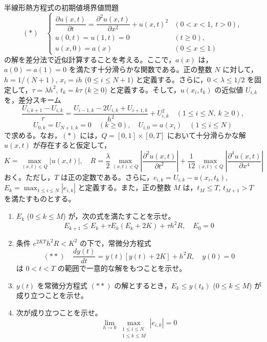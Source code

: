 \documentclass[12pt]{jlreq}
\begin{document}
半線形熱方程式の初期値境界値問題
\[
  (*) \quad \begin{cases} \dfrac{\partial u(x,t)}{\partial t} = \dfrac{\partial^2 u(x,t)}{\partial x^2} + u(x,t)^2 & (0 < x < 1,\ t > 0), \\ u(0,t) = u(1,t) = 0 & (t \ge 0), \\ u(x,0) = a(x) & (0 \le x \le 1) \end{cases}
\]
の解を差分法で近似計算することを考える。ここで，$a(x)$ は，$a(0) = a(1) = 0$ を満たす十分滑らかな関数である。正の整数 $N$ に対して，$h = 1/(N+1)$, $x_i = ih$ ($0 \le i \le N+1$) と定義する。さらに，$0 < \lambda \le 1/2$ を固定して，$\tau = \lambda h^2$, $t_k = k\tau$ ($k \ge 0$) と定義する。そして，$u(x_i, t_k)$ の近似値 $U_{i,k}$ を，差分スキーム
\[
  \frac{U_{i,k+1} - U_{i,k}}{\tau} = \frac{U_{i-1,k} - 2U_{i,k} + U_{i+1,k}}{h^2} + U_{i,k}^2 \quad (1 \le i \le N,\ k \ge 0),
\]
\[
  U_{0,k} = U_{N+1,k} = 0 \quad (k \ge 0),\quad U_{i,0} = a(x_i) \quad (1 \le i \le N)
\]
で求める。なお，$(*)$ には，$Q = [0,1] \times [0,T]$ において十分滑らかな解 $u(x,t)$ が存在すると仮定して，
\[
  K = \max_{(x,t) \in Q} |u(x,t)|,\quad R = \frac{\lambda}{2}\max_{(x,t) \in Q}\left|\frac{\partial^2 u(x,t)}{\partial t^2}\right| + \frac{1}{12}\max_{(x,t) \in Q}\left|\frac{\partial^4 u(x,t)}{\partial x^4}\right|
\]
おく。ただし，$T$ は正の定数である。さらに，$e_{i,k} = U_{i,k} - u(x_i, t_k)$, $E_k = \max_{1 \le i \le N} |e_{i,k}|$ と定義する。また，正の整数 $M$ は，$t_M \le T$, $t_{M+1} > T$ を満たすものとする。

\begin{enumerate}
  \item $E_k$ ($0 \le k \le M$) が，次の式を満たすことを示せ。
  \[
    E_{k+1} \le E_k + \tau E_k (E_k + 2K) + \tau h^2 R,\quad E_0 = 0
  \]
  \item 条件 $e^{2KT} h^2 R < K^2$ の下で，常微分方程式
  \[
    (**) \quad \frac{dy(t)}{dt} = y(t)[y(t) + 2K] + h^2 R,\quad y(0) = 0
  \]
  は $0 < t < T$ の範囲で一意的な解をもつことを示せ。
  \item $y(t)$ を常微分方程式 $(**)$ の解とするとき，$E_k \le y(t_k)$ ($0 \le k \le M$) が成り立つことを示せ。
  \item 次が成り立つことを示せ。
  \[
    \lim_{h \to 0} \max_{\substack{1 \le i \le N \\ 1 \le k \le M}} |e_{i,k}| = 0
  \]
\end{enumerate}
\end{document}
